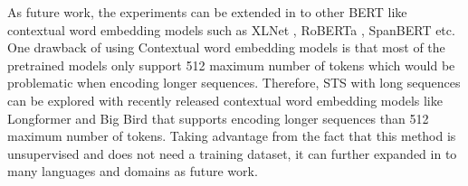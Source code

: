 As future work, the experiments can be extended in to other BERT like contextual word embedding models such as XLNet \cite{yang2019xlnet}, RoBERTa \cite{liu2019roberta}, SpanBERT \cite{joshi-etal-2020-spanbert} etc. One drawback of using Contextual word embedding models is that most of the pretrained models only support 512 maximum number of tokens which would be problematic when encoding longer sequences. Therefore, STS with long sequences can be explored with recently released contextual word embedding models like Longformer \cite{beltagy2020}  and Big Bird \cite{zaheer2021} that supports encoding longer sequences than 512 maximum number of tokens. Taking advantage from the fact that this method is unsupervised and does not need a training dataset, it can further expanded in to many languages and domains as future work.   

